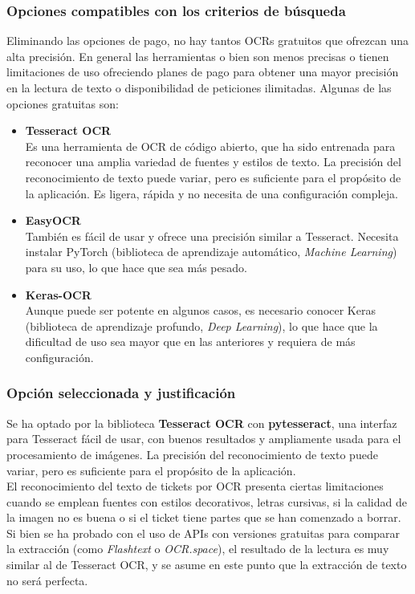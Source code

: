 \subsubsection{Opciones compatibles con los criterios de búsqueda}
Eliminando las opciones de pago, no hay tantos OCRs gratuitos que ofrezcan una alta precisión. En general las herramientas o bien son menos precisas o tienen limitaciones de uso ofreciendo planes de pago para obtener una mayor precisión en la lectura de texto o disponibilidad de peticiones ilimitadas. Algunas de las opciones gratuitas son:
\begin{itemize}
    \item \textbf{Tesseract OCR}\\
        Es una herramienta de OCR de código abierto, que ha sido entrenada para reconocer una amplia variedad de fuentes y estilos de texto. La precisión del reconocimiento de texto puede variar, pero es suficiente para el propósito de la aplicación. Es ligera, rápida y no necesita de una configuración compleja.
    \item \textbf{EasyOCR}\\
        También es fácil de usar y ofrece una precisión similar a Tesseract. Necesita instalar PyTorch (biblioteca de aprendizaje automático, \textit{Machine Learning}) para su uso, lo que hace que sea más pesado.
    \item \textbf{Keras-OCR}\\
        Aunque puede ser potente en algunos casos, es necesario conocer Keras (biblioteca de aprendizaje profundo, \textit{Deep Learning}), lo que hace que la dificultad de uso sea mayor que en las anteriores y requiera de más configuración. 
\end{itemize}

\subsubsection{Opción seleccionada y justificación}
Se ha optado por la biblioteca \textbf{Tesseract OCR} con \textbf{pytesseract}, una interfaz para Tesseract fácil de usar, con buenos resultados y ampliamente usada para el procesamiento de imágenes. La precisión del reconocimiento de texto puede variar, pero es suficiente para el propósito de la aplicación.\\




El reconocimiento del texto de tickets por OCR presenta ciertas limitaciones cuando se emplean fuentes con estilos decorativos, letras cursivas, si la calidad de la imagen no es buena o si el ticket tiene partes que se han comenzado a borrar. Si bien se ha probado con el uso de APIs con versiones gratuitas para comparar la extracción (como \textit{Flashtext} o \textit{OCR.space}), el resultado de la lectura es muy similar al de Tesseract OCR, y se asume en este punto que la extracción de texto no será perfecta.

